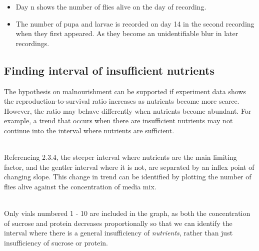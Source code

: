 \documentclass{article}
\begin{document}
\begin{itemize}
    \item Day n shows the number of flies alive on the day of recording.
    \item The number of pupa and larvae is recorded on day 14 in the second recording when they first appeared. As they become an unidentifiable blur in later recordings.
\end{itemize}

\subsection{Finding interval of insufficient nutrients}

The hypothesis on malnourishment can be supported if experiment data shows the reproduction-to-survival ratio increases as nutrients become more scarce. However, the ratio may behave differently when nutrients become abundant. For example, a trend that occurs when there are insufficient nutrients may not continue into the interval where nutrients are sufficient.

\noindent\\
Referencing 2.3.4, the steeper interval where nutrients are the main limiting factor, and the gentler interval where it is not, are separated by an inflex point of changing slope. This change in trend can be identified by plotting the number of flies alive against the concentration of media mix.

\noindent\\
Only vials numbered 1 - 10 are included in the graph, as both the concentration of sucrose and protein decreases proportionally so that we can identify the interval where there is a general insufficiency of \emph{nutrients}, rather than just insufficiency of sucrose or protein.
\end{document}
